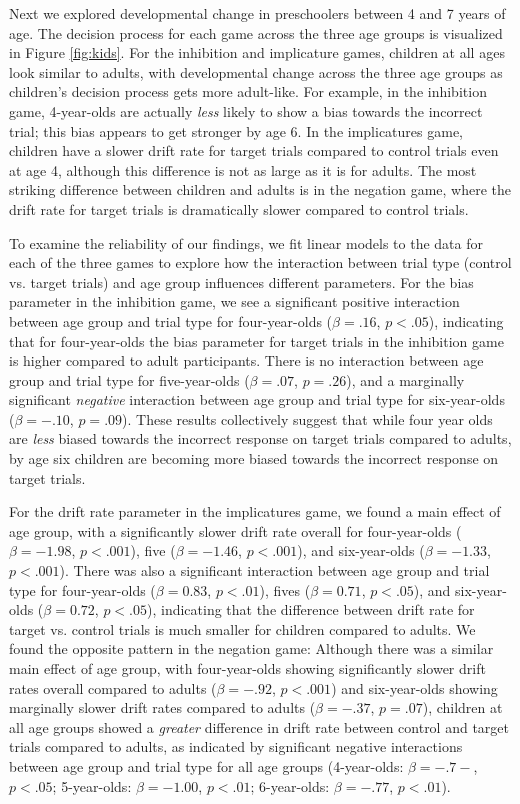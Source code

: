 \documentclass[10pt,letterpaper]{article}
\begin{document}
Next we explored developmental change in preschoolers between 4 and 7 years of age.  The decision process for each game across the three age groups is visualized in Figure \ref{fig:kids}.  For the inhibition and implicature games, children at all ages look similar to adults, with developmental change across the three age groups as children's decision process gets more adult-like.  For example, in the inhibition game, 4-year-olds are actually \emph{less} likely to show a bias towards the incorrect trial; this bias appears to get stronger by age 6.  In the implicatures game, children have a slower drift rate for target trials compared to control trials even at age 4, although this difference is not as large as it is for adults. The most striking difference between children and adults is in the negation game, where the drift rate for target trials is dramatically slower compared to control trials.  

To examine the reliability of our findings, we fit linear models to the data for each of the three games to explore how the interaction between trial type (control vs. target trials) and age group influences different parameters. For the bias parameter in the inhibition game, we see a significant positive interaction between age group and trial type for four-year-olds ($\beta = .16$, $p< .05$), indicating that for four-year-olds the bias parameter for target trials in the inhibition game is higher compared to adult participants.  There is no interaction between age group and trial type for five-year-olds ($\beta = .07$, $p = .26$), and a marginally significant \emph{negative} interaction between age group and trial type for six-year-olds ($\beta = -.10$, $p = .09$).  These results collectively suggest that while four year olds are \emph{less} biased towards the incorrect response on target trials compared to adults, by age six children are becoming more biased towards the incorrect response on target trials.  

For the drift rate parameter in the implicatures game, we found a main effect of age group, with a significantly slower drift rate overall for four-year-olds ($\beta = -1.98$, $p < .001$), five ($\beta = -1.46$, $p < .001$), and six-year-olds ($\beta = -1.33$, $p < .001$).  There was also a significant interaction between age group and trial type for four-year-olds ($\beta = 0.83$, $p <.01$), fives ($\beta = 0.71$, $p <.05$), and six-year-olds ($\beta = 0.72$, $p <.05$), indicating that the difference between drift rate for target vs. control trials is much smaller for children compared to adults.  We found the opposite pattern in the negation game: Although there was a similar main effect of age group, with four-year-olds showing significantly slower drift rates overall compared to adults ($\beta = -.92$, $p <.001$) and six-year-olds showing marginally slower drift rates compared to adults ($\beta = -.37$, $p = .07$), children at all age groups showed a \emph{greater} difference in drift rate between control and target trials compared to adults, as indicated by significant negative interactions between age group and trial type for all age groups (4-year-olds: $\beta = -.7-$, $p <.05$; 5-year-olds: $\beta = -1.00$, $p <.01$; 6-year-olds: $\beta = -.77$, $p <.01$).  
\end{document}
